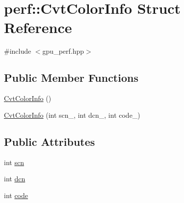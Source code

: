 \hypertarget{structperf_1_1CvtColorInfo}{\section{perf\-:\-:Cvt\-Color\-Info Struct Reference}
\label{structperf_1_1CvtColorInfo}
}


{\ttfamily \#include $<$gpu\-\_\-perf.\-hpp$>$}

\subsection*{Public Member Functions}
\begin{DoxyCompactItemize}
\item 
\hyperlink{structperf_1_1CvtColorInfo_a18f2a4e5720cec2323d22cae03a3cf57}{Cvt\-Color\-Info} ()
\item 
\hyperlink{structperf_1_1CvtColorInfo_aa888d7492ce8b1c4777bb89a88d10e98}{Cvt\-Color\-Info} (int scn\-\_\-, int dcn\-\_\-, int code\-\_\-)
\end{DoxyCompactItemize}
\subsection*{Public Attributes}
\begin{DoxyCompactItemize}
\item 
int \hyperlink{structperf_1_1CvtColorInfo_a36ee9846b00d85e731275820b5b0f891}{scn}
\item 
int \hyperlink{structperf_1_1CvtColorInfo_aa1a643279c1f154fc0281cbf5d137492}{dcn}
\item 
int \hyperlink{structperf_1_1CvtColorInfo_a7afa952c16b394f6cff6debd044903c2}{code}
\end{DoxyCompactItemize}


